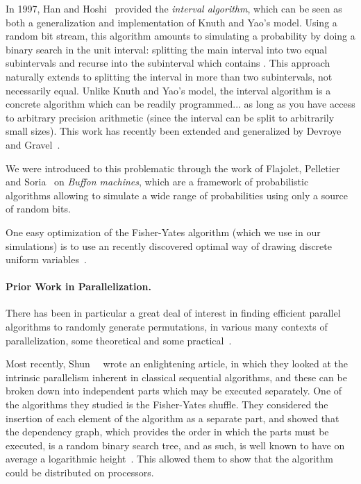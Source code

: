 \documentclass[letter,11pt,en]{quick-document}
\begin{document}
In 1997, Han and Hoshi~\cite{HaHo97} provided the \emph{interval
  algorithm}, which can be seen as both a generalization and
implementation of Knuth and Yao's model. Using a random bit stream, this
algorithm amounts to simulating a probability  by doing a binary search
in the unit interval: splitting the main interval into two equal
subintervals and recurse into the subinterval which contains . This
approach naturally extends to splitting the interval in more than two
subintervals, not necessarily equal. Unlike Knuth and Yao's model, the
interval algorithm is a concrete algorithm which can be readily
programmed... as long as you have access to arbitrary precision arithmetic
(since the interval can be split to arbitrarily small sizes). This work
has recently been extended and generalized by Devroye and
Gravel~\cite{DeGr15}.

We were introduced to this problematic through the work of Flajolet,
Pelletier and Soria~\cite{FlPeSo11} on \emph{Buffon machines}, which are a
framework of probabilistic algorithms allowing to simulate a wide range of
probabilities using only a source of random bits.

One easy optimization of the Fisher-Yates algorithm (which we use in our
simulations) is to use an recently discovered optimal way of drawing
discrete uniform variables~\cite{Lumbroso13}.

\paragraph{Prior Work in Parallelization.}

There has been in particular a great deal of interest in finding efficient
parallel algorithms to randomly generate permutations, in various many
contexts of parallelization, some theoretical and some
practical~\cite{Gustedt03, Gustedt08, Sanders98, Hagerup91, Alonso96,
  CoBa06, CzKaKuLo98, Anderson90}.

Most recently, Shun~\etal~\cite{ShGuBlFiGi15} wrote an enlightening
article, in which they looked at the intrinsic parallelism inherent in
classical sequential algorithms, and these can be broken down into
independent parts which may be executed separately. One of the algorithms
they studied is the Fisher-Yates shuffle. They considered the insertion of
each element of the algorithm as a separate part, and showed that the
dependency graph, which provides the order in which the parts must be
executed, is a random binary search tree, and as such, is well known to
have on average a logarithmic height~\cite{Devroye86}. This allowed them
to show that the algorithm could be distributed on  processors.
\end{document}
